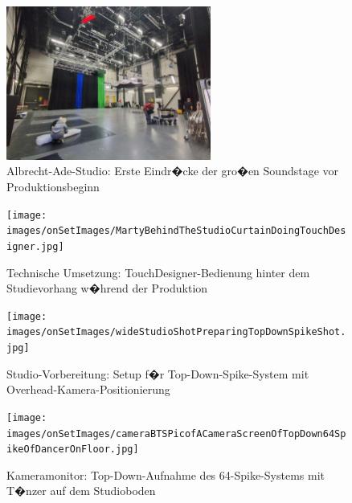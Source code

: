 \begin{figure}[!htbp]
   \centering
   \includegraphics[width=0.6\textwidth,height=0.25\textheight,keepaspectratio]{images/onSetImages/InsideWideshotAlbrechtAdeStudio.jpg}
   \caption{Albrecht-Ade-Studio: Erste Eindr�cke der gro�en Soundstage vor Produktionsbeginn}
   \label{fig:studio_interior}
\end{figure}

\begin{figure}[!htbp]
   \centering
   \texttt{[image: images/onSetImages/MartyBehindTheStudioCurtainDoingTouchDesigner.jpg]}
   \caption{Technische Umsetzung: TouchDesigner-Bedienung hinter dem Studievorhang w�hrend der Produktion}
   \label{fig:technical_operation}
\end{figure}

\begin{figure}[!htbp]
   \centering
   \texttt{[image: images/onSetImages/wideStudioShotPreparingTopDownSpikeShot.jpg]}
   \caption{Studio-Vorbereitung: Setup f�r Top-Down-Spike-System mit Overhead-Kamera-Positionierung}
   \label{fig:topdown_setup}
\end{figure}

\begin{figure}[!htbp]
   \centering
   \texttt{[image: images/onSetImages/cameraBTSPicofACameraScreenOfTopDown64SpikeOfDancerOnFloor.jpg]}
   \caption{Kameramonitor: Top-Down-Aufnahme des 64-Spike-Systems mit T�nzer auf dem Studioboden}
   \label{fig:camera_monitor}
\end{figure}

